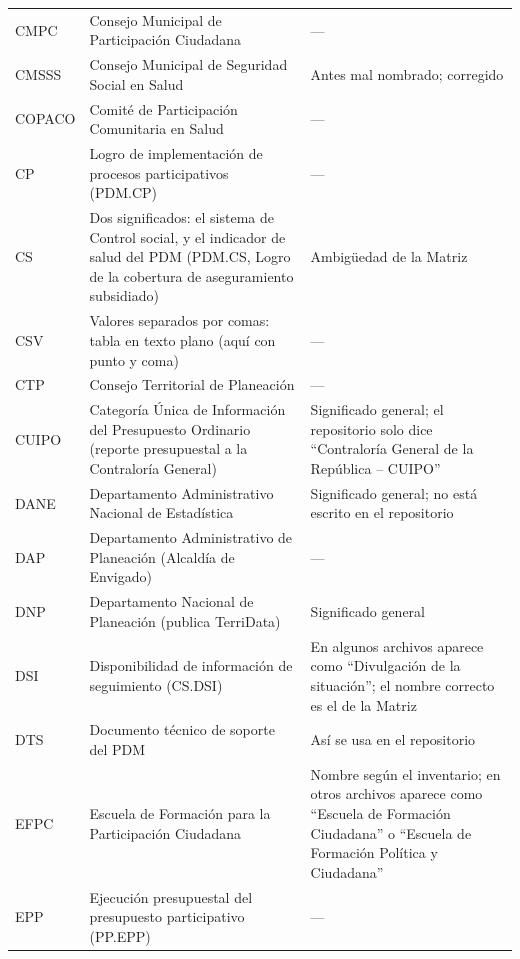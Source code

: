 \documentclass[11pt,letterpaper]{article}
\begin{document}
{\begin{xltabular}{\linewidth}{L{2.56cm}L{8.91cm}L{4.46cm}}
CMPC & Consejo Municipal de Participación Ciudadana & --- \\
CMSSS & Consejo Municipal de Seguridad Social en Salud & Antes mal nombrado; corregido \\
COPACO & Comité de Participación Comunitaria en Salud & --- \\
CP & Logro de implementación de procesos participativos (PDM.CP) & --- \\
CS & Dos significados: el sistema de Control social, y el indicador de salud del PDM (PDM.CS, Logro de la cobertura de aseguramiento subsidiado) & Ambigüedad de la Matriz \\
CSV & Valores separados por comas: tabla en texto plano (aquí con punto y coma) & --- \\
CTP & Consejo Territorial de Planeación & --- \\
CUIPO & Categoría Única de Información del Presupuesto Ordinario (reporte presupuestal a la Contraloría General) & Significado general; el repositorio solo dice ``Contraloría General de la República -- CUIPO'' \\
DANE & Departamento Administrativo Nacional de Estadística & Significado general; no está escrito en el repositorio \\
DAP & Departamento Administrativo de Planeación (Alcaldía de Envigado) & --- \\
DNP & Departamento Nacional de Planeación (publica TerriData) & Significado general \\
DSI & Disponibilidad de información de seguimiento (CS.DSI) & En algunos archivos aparece como ``Divulgación de la situación''; el nombre correcto es el de la Matriz \\
DTS & Documento técnico de soporte del PDM & Así se usa en el repositorio \\
EFPC & Escuela de Formación para la Participación Ciudadana & Nombre según el inventario; en otros archivos aparece como ``Escuela de Formación Ciudadana'' o ``Escuela de Formación Política y Ciudadana'' \\
EPP & Ejecución presupuestal del presupuesto participativo (PP.EPP) & --- \\

\end{xltabular}}
\end{document}
